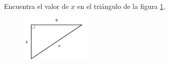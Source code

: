 \question[15]  Encuentra el valor de $x$ en el triángulo de la figura \ref{fig:lados_pitagoras_11}.
\begin{figure}[H]
    \begin{center}
        \includegraphics[width=0.3\textwidth]{../images/lados_pitagoras_11.png}
    \end{center}
    \caption{}
    \label{fig:lados_pitagoras_11}
\end{figure}